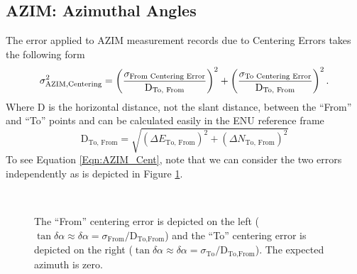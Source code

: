 \subsection{AZIM: Azimuthal Angles}
The error applied to AZIM measurement records due to Centering Errors takes the following form
\begin{equation}
\label{Eqn:AZIM_Cent}
\sigma_{\text{AZIM,Centering}}^2=\left(\frac{\sigma_{\text{From Centering Error}}}{\text{D}_{\text{To, From}}}\right)^2+\left(\frac{\sigma_{\text{To Centering Error}}}{\text{D}_{\text{To, From}}}\right)^2.
\end{equation}
Where $\text{D}$ is the horizontal distance, not the slant distance, between the ``From'' and ``To'' points and can be calculated easily in the ENU reference frame
\begin{equation}
    \text{D}_{\text{To, From}}=\sqrt{\left(\Delta E_{\text{To, From}}\right)^2 + \left(\Delta N_{\text{To, From}}\right)^2}
\end{equation}
To see Equation \ref{Eqn:AZIM_Cent}, note that we can consider the two errors independently as is depicted in Figure \ref{Fig:AZIM_Cent}.
\begin{figure}[!htbp]
\centering
{}~~~~~~~
\caption{The ``From'' centering error is depicted on the left ($\tan\delta\alpha\approx\delta\alpha=\sigma_{\text{From}}/\text{D}_{\text{To,From}}$) and the ``To'' centering error is depicted on the right ($\tan\delta\alpha\approx\delta\alpha=\sigma_{\text{To}}/\text{D}_{\text{To,From}}$).  The expected azimuth is zero.}
\label{Fig:AZIM_Cent}
\end{figure}


